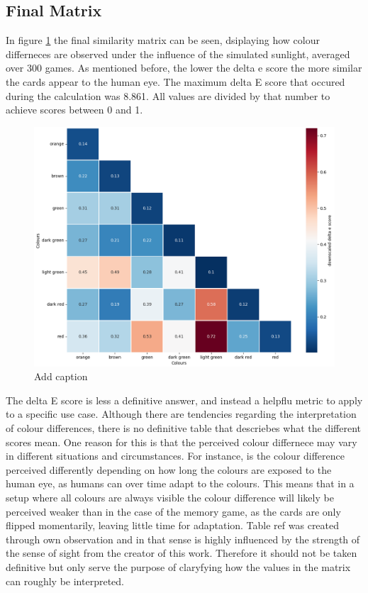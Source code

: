 \subsection{Final Matrix}
In figure \ref{fig:simMatrix} the final similarity matrix can be seen, dsiplaying how colour differneces are observed under the influence of the simulated sunlight, averaged over 300 games. As mentioned before, the lower the delta e score the more similar the cards appear to the human eye. The maximum delta E score that occured during the calculation was 8.861. All values are divided by that number to achieve scores between 0 and 1.
\begin{figure}[H]
	\centering
	\includegraphics[width=15cm]{images/simMatrix.png}
	\caption[Bild kurz]{Add caption}
	\label{fig:simMatrix}
\end{figure}
The delta E score is less a definitive answer, and instead a helpflu metric to apply to a specific use case. Although there are tendencies regarding the interpretation of colour differences, there is no definitive table that descriebes what the different scores mean. One reason for this is that the perceived colour differnece may vary in different situations and circumstances. For instance, is the colour difference perceived differently depending on how long the colours are exposed to the human eye, as humans can over time adapt to the colours. This means that in a setup where all colours are always visible the colour difference will likely be perceived weaker than in the case of the memory game, as the cards are only flipped momentarily, leaving little time for adaptation. Table ref was created through own observation and in that sense is highly influenced by the strength of the sense of sight from the creator of this work. Therefore it should not be taken definitive but only serve the purpose of claryfying how the values in the matrix can roughly be interpreted.

